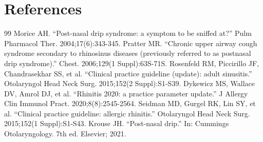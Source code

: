 \section*{References}
\begin{thebibliography}{99}
 Morice AH. ``Post-nasal drip syndrome: a symptom to be sniffed at?'' Pulm Pharmacol Ther. 2004;17(6):343-345.
 Pratter MR. ``Chronic upper airway cough syndrome secondary to rhinosinus diseases (previously referred to as postnasal drip syndrome).'' Chest. 2006;129(1 Suppl):63S-71S.
 Rosenfeld RM, Piccirillo JF, Chandrasekhar SS, et al. ``Clinical practice guideline (update): adult sinusitis.'' Otolaryngol Head Neck Surg. 2015;152(2 Suppl):S1-S39.
 Dykewicz MS, Wallace DV, Amrol DJ, et al. ``Rhinitis 2020: a practice parameter update.'' J Allergy Clin Immunol Pract. 2020;8(8):2545-2564.
 Seidman MD, Gurgel RK, Lin SY, et al. ``Clinical practice guideline: allergic rhinitis.'' Otolaryngol Head Neck Surg. 2015;152(1 Suppl):S1-S43.
 Krouse JH. ``Post-nasal drip.'' In: Cummings Otolaryngology. 7th ed. Elsevier; 2021.
\end{thebibliography}
